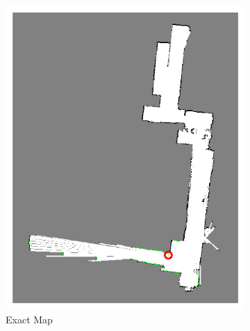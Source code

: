 \documentclass[11pt,professionalfonts,hyperref={pdftex,pdfpagemode=none,pdfstartview=FitH}]{beamer}
\begin{document}
\begin{frame}
\begin{figure}[!htbp]
\begin{subfigure}{0.2\textwidth}
        \centering
        \includegraphics[width=\textwidth]{EISM_Image_19.pdf}
        \caption*{Exact Map}
    \end{subfigure}
    \begin{subfigure}{0.2\textwidth}
        \centering

\end{subfigure}
\end{figure}
\end{frame}
\end{document}
